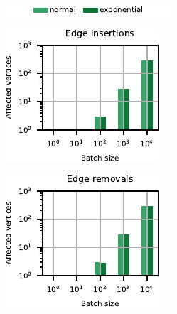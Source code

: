 \begin{figure}[t]
\centering
\begin{subfigure}[b]{.5\textwidth}
\begin{subfigure}[t]{\textwidth}
\centering
\includegraphics{sources/plots/dyn-mwm/legend-cplx.pdf}
\end{subfigure}

\begin{subfigure}[b]{.5\textwidth}
\centering
\includegraphics[width=.9\textwidth]{sources/plots/dyn-mwm/affected-rmat-insertion.pdf}
\end{subfigure}\hfill
\begin{subfigure}[b]{.5\textwidth}
\centering
\includegraphics[width=.9\textwidth]{sources/plots/dyn-mwm/affected-rmat-removal.pdf}

\end{subfigure}
\end{subfigure}
\end{figure}
